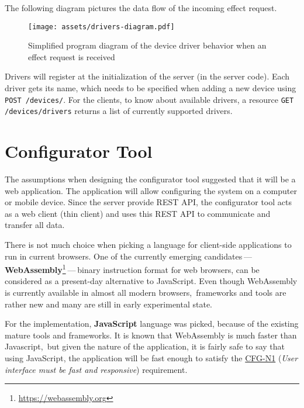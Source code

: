 The following diagram pictures the data flow of the incoming effect request.

\begin{figure}[h]{}
\centering\texttt{[image: assets/drivers-diagram.pdf]}
\caption{Simplified program diagram of the device driver behavior when an effect request is received}
\end{figure}

Drivers will register at the initialization of the server (in the server code).
Each driver gets its name, which needs to be specified when adding a new
device using \texttt{POST /devices/}. For the clients, to know about available
drivers, a resource \texttt{GET /devices/drivers} returns a list
of currently supported drivers.


\hypertarget{x-configurator-tool}{\section{Configurator Tool}}
The assumptions when designing the configurator tool suggested that it will
be a web application. The application will allow configuring the system
on a computer or mobile device. Since the server provide REST API,
the configurator tool acts as a
web client (thin client) and uses this REST API to communicate and transfer
all data.


There is not much choice when picking a language for client-side applications
to run in current browsers. One of the currently
emerging candidates — \textbf{WebAssembly}\footnote{\href{https://webassembly.org}{https://webassembly.org}} — binary instruction format for web browsers, can be considered as
a present-day alternative to JavaScript. Even though WebAssembly is
currently available in almost all modern browsers,\,\cite{wasmroadmap} frameworks
and tools are rather new and many are still in early experimental state.


For the implementation, \textbf{JavaScript} language was picked, because
of the existing mature tools and frameworks. It is known that WebAssembly
is much faster than Javascript,\,\cite{wasmfast} but given the nature of the
application, it is fairly safe to say that using JavaScript, the application
will be fast enough to satisfy the \hyperref[cfg-n1]{CFG-N1}
(\emph{User interface must be fast and responsive})
requirement.

